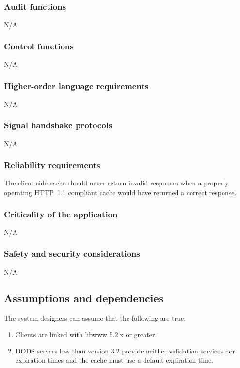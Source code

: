 \documentclass{article}
\begin{document}
\subsubsection{Audit functions}
N/A 

\subsubsection{Control functions}
N/A 

\subsubsection{Higher-order language requirements}
N/A 

\subsubsection{Signal handshake protocols}
N/A 

\subsubsection{Reliability requirements}
The client-side cache should never return invalid responses when a properly
operating HTTP~1.1 compliant cache would have returned a correct response.

\subsubsection{Criticality of the application}
N/A 

\subsubsection{Safety and security considerations}
N/A

\subsection{Assumptions and dependencies}
\label{sec:assumptions}
The system designers can assume that the following are true:
\begin{enumerate}
\item Clients are linked with libwww 5.2.x or greater.
\item DODS servers less than version 3.2 provide neither validation services
  nor expiration times and the cache must use a default expiration time.
\end{enumerate}
\end{document}
